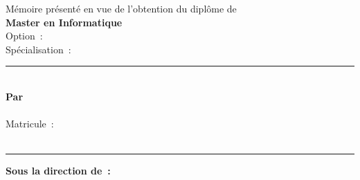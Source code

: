 \begin{center}
  \normalsize
  M\'emoire pr\'esent\'e en vue de l'obtention du dipl\^ome de\\[0.3em]
  \textbf{Master en Informatique}\\[0.3em]
  Option~: \textbf{\thesisOption}\\[0.12em]
  Sp\'ecialisation~: \textbf{\thesisSpecialization}

  \vspace{2em}
  \textcolor{udsTealDark}{\rule{\linewidth}{2.5pt}}\\[0.8em]%
  \textbf{Par}\\[0.7em]%
  {\LARGE\color{udsAuthorBlue}\textbf{\thesisAuthor}}\\[0.6em]%
  Matricule~: \textbf{\thesisMatricule}\\[0.3em]%
  \textit{\thesisPriorDegree}\\[0.8em]%
  \textcolor{udsTealDark}{\rule{\linewidth}{2.5pt}}

  \vspace{2em}
  \textbf{Sous la direction de~:}

  \vspace{0.9em}
  \textbf{\thesisSupervisor}\\[0.3em]
  \textit{\thesisSupervisorTitle}

  \vspace{3em}
\end{center}

\clearpage
